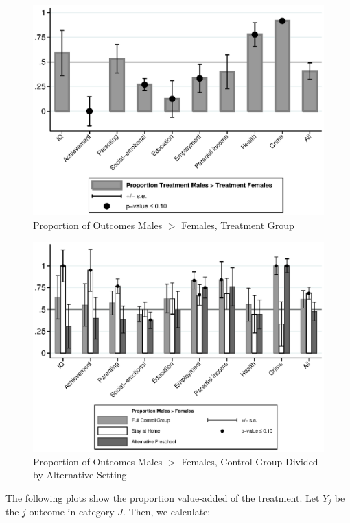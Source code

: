 \begin{figure}
\centering
\caption{Proportion of Outcomes Males $>$ Females, Treatment Group}\label{fig2}
\includegraphics[width=\textwidth]{output/gendergaps-treatment}
\end{figure}

\begin{figure}
\centering
\caption{Proportion of Outcomes Males $>$ Females, Control Group Divided by Alternative Setting}\label{fig3}
\includegraphics[width=\textwidth]{output/gendergaps-control-moderated-altpre}
\end{figure}

The following plots show the proportion value-added of the treatment. Let $Y_j$ be the $j$ outcome in category $J$. Then, we calculate:

